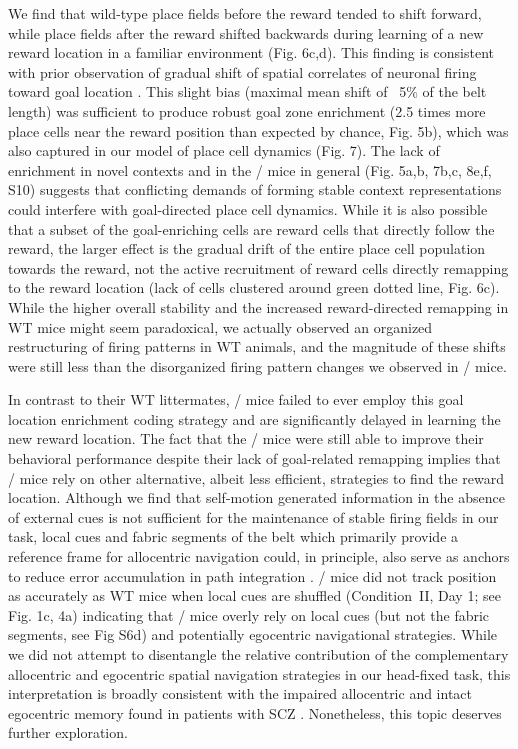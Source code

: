 We find that wild-type place fields before the reward tended to shift forward, while place fields after the reward shifted backwards during learning of a new reward location in a familiar environment (Fig. 6c,d). This finding is consistent with prior observation of gradual shift of spatial correlates of neuronal firing toward goal location \citep{Lee2006}. This slight bias (maximal mean shift of ~5$\%$ of the belt length) was sufficient to produce robust goal zone enrichment (2.5 times more place cells near the reward position than expected by chance, Fig. 5b), which was also captured in our model of place cell dynamics (Fig. 7). The lack of enrichment in novel contexts and in the \df/ mice in general (Fig. 5a,b, 7b,c, 8e,f, S10) suggests that conflicting demands of forming stable context representations could interfere with goal-directed place cell dynamics.  While it is also possible that a subset of the goal-enriching cells are reward cells that directly follow the reward, the larger effect is the gradual drift of the entire place cell population towards the reward, not the active recruitment of reward cells directly remapping to the reward location (lack of cells clustered around green dotted line, Fig. 6c). While the higher overall stability and the increased reward-directed remapping in WT mice might seem paradoxical, we actually observed an organized restructuring of firing patterns in WT animals, and the magnitude of these shifts were still less than the disorganized firing pattern changes we observed in \df/ mice.

In contrast to their WT littermates, \df/ mice failed to ever employ this goal location enrichment coding strategy and are significantly delayed in learning the new reward location. The fact that the \df/ mice were  still able to improve their behavioral performance despite their lack of goal-related remapping implies that \df/ mice rely on other alternative, albeit less efficient, strategies to find the reward location. Although we find that self-motion generated information in the absence of external cues is not sufficient for the maintenance of stable firing fields in our task, local cues and fabric segments of the belt which primarily provide a reference frame for allocentric navigation could, in principle, also serve as anchors to reduce error accumulation in path integration \citep{Etienne2004, Gothard1996}. \df/ mice did not track position as accurately as WT mice when local cues are shuffled (Condition~II, Day 1; see Fig. 1c, 4a) indicating that \df/ mice overly rely on local cues (but not the fabric segments, see Fig S6d) and potentially egocentric navigational strategies. While we did not attempt to disentangle the relative contribution of the complementary allocentric and egocentric spatial navigation strategies in our head-fixed task, this interpretation is broadly consistent with the impaired allocentric and intact egocentric memory found in patients with SCZ \citep{Agarwal2015, Weniger2008}.  Nonetheless, this topic deserves further exploration.

